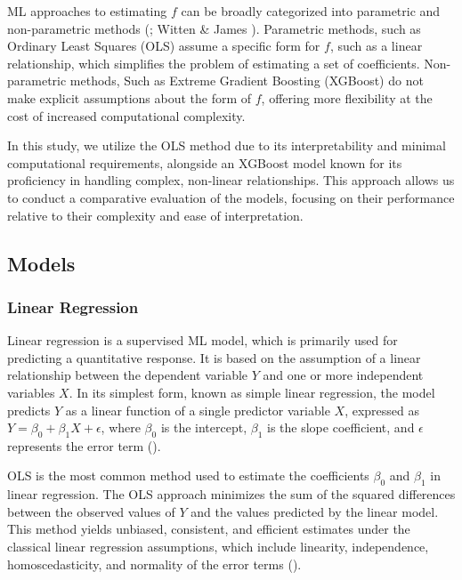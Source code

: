 ML approaches to estimating \(f\) can be broadly categorized into parametric and non-parametric methods (\cite{cox2006principles}; Witten \& James \cite*{witten2013introduction}). Parametric methods, such as Ordinary Least Squares (OLS) assume a specific form for \(f\), such as a linear relationship, which simplifies the problem of estimating a set of coefficients. Non-parametric methods, Such as Extreme Gradient Boosting (XGBoost) do not make explicit assumptions about the form of \(f\), offering more flexibility at the cost of increased computational complexity.

In this study, we utilize the OLS method due to its interpretability and minimal computational requirements, alongside an XGBoost model known for its proficiency in handling complex, non-linear relationships. This approach allows us to conduct a comparative evaluation of the models, focusing on their performance relative to their complexity and ease of interpretation.



\subsection{Models}

\subsubsection{Linear Regression}
Linear regression is a supervised ML model, which is primarily used for predicting a quantitative response. It is based on the assumption of a linear relationship between the dependent variable \(Y\) and one or more independent variables \(X\). In its simplest form, known as simple linear regression, the model predicts \(Y\) as a linear function of a single predictor variable \(X\), expressed as \(Y = \beta_0 + \beta_1X + \epsilon\), where \(\beta_0\) is the intercept, \(\beta_1\) is the slope coefficient, and \(\epsilon\) represents the error term (\cite{freedman2009statistical}).

OLS is the most common method used to estimate the coefficients \(\beta_0\) and \(\beta_1\) in linear regression. The OLS approach minimizes the sum of the squared differences between the observed values of \(Y\) and the values predicted by the linear model. This method yields unbiased, consistent, and efficient estimates under the classical linear regression assumptions, which include linearity, independence, homoscedasticity, and normality of the error terms (\cite{book:econometricswatson}).

